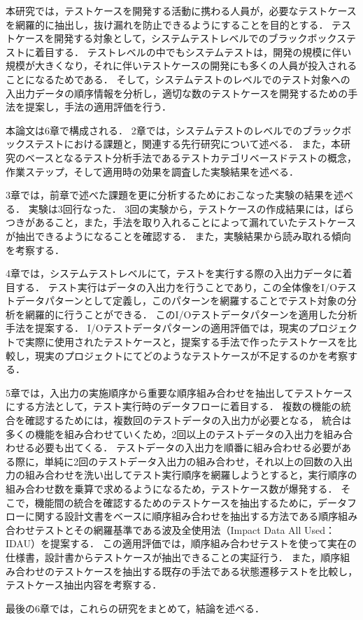 本研究では，テストケースを開発する活動に携わる人員が，必要なテストケースを網羅的に抽出し，抜け漏れを防止できるようにすることを目的とする．
テストケースを開発する対象として，システムテストレベルでのブラックボックステストに着目する．
テストレベルの中でもシステムテストは，開発の規模に伴い規模が大きくなり，それに伴いテストケースの開発にも多くの人員が投入されることになるためである．
そして，システムテストのレベルでのテスト対象への入出力データの順序情報を分析し，適切な数のテストケースを開発するための手法を提案し，手法の適用評価を行う．

本論文は6章で構成される．
2章では，システムテストのレベルでのブラックボックステストにおける課題と，関連する先行研究について述べる．
また，本研究のベースとなるテスト分析手法であるテストカテゴリベースドテストの概念，作業ステップ，そして適用時の効果を調査した実験結果を述べる．

3章では，前章で述べた課題を更に分析するためにおこなった実験の結果を述べる．
実験は3回行なった．
3回の実験から，テストケースの作成結果には，ばらつきがあること，また，手法を取り入れることによって漏れていたテストケースが抽出できるようになることを確認する．
また，実験結果から読み取れる傾向を考察する．

4章では，システムテストレベルにて，テストを実行する際の入出力データに着目する．
テスト実行はデータの入出力を行うことであり，この全体像をI/Oテストデータパターンとして定義し，このパターンを網羅することでテスト対象の分析を網羅的に行うことができる．
このI/Oテストデータパターンを適用した分析手法を提案する．
I/Oテストデータパターンの適用評価では，現実のプロジェクトで実際に使用されたテストケースと，提案する手法で作ったテストケースを比較し，現実のプロジェクトにてどのようなテストケースが不足するのかを考察する．

5章では，入出力の実施順序から重要な順序組み合わせを抽出してテストケースにする方法として，テスト実行時のデータフローに着目する．
複数の機能の統合を確認するためには，複数回のテストデータの入出力が必要となる，
統合は多くの機能を組み合わせていくため，2回以上のテストデータの入出力を組み合わせる必要も出てくる．
テストデータの入出力を順番に組み合わせる必要がある際に，単純に2回のテストデータ入出力の組み合わせ，それ以上の回数の入出力の組み合わせを洗い出してテスト実行順序を網羅しようとすると，実行順序の組み合わせ数を乗算で求めるようになるため，テストケース数が爆発する．
そこで，機能間の統合を確認するためのテストケースを抽出するために，データフローに関する設計文書をベースに順序組み合わせを抽出する方法である順序組み合わせテストとその網羅基準である波及全使用法（Impact Data All Used：IDAU）を提案する．
この適用評価では，順序組み合わせテストを使って実在の仕様書，設計書からテストケースが抽出できることの実証行う．
また，順序組み合わせのテストケースを抽出する既存の手法である状態遷移テストを比較し，テストケース抽出内容を考察する．

最後の6章では，これらの研究をまとめて，結論を述べる．
